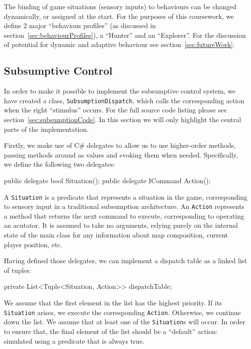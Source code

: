 \documentclass[11pt]{article}
\begin{document}
The binding of game situations (sensory inputs) to behaviours can be changed dynamically, or assigned at the start. For the purposes of this coursework, we define 2 major ``behavious profiles'' (as discussed in section~\ref{sec:behaviourProfiles}), a ``Hunter'' and an ``Explorer''. For the discussion of potential for dynamic and adaptive behaviour see section~\ref{sec:futureWork}.
\subsection{Subsumptive Control}

In order to make it possible to implement the subsumptive control system, we have created a class, \verb|SubsumptionDispatch|, which calls the corresponding action when the right ``stimulus'' occurs. For the full source code listing please see section~\ref{sec:subsumptionCode}. In this section we will only highlight the central parts of the implementation.

Firstly, we make use of C\# delegates to allow us to use higher-order methods, passing methods around as values and evoking them when needed. Specifically, we define the following two delegates:

\begin{code}
public delegate bool Situation();
public delegate ICommand Action();
\end{code}

A \verb|Situation| is a predicate that represents a situation in the game, corresponding to sensory input in a traditional subsumption architecture. An \verb|Action| represents a method that returns the next command to execute, corresponding to operating an acutator. It is assumed to take no arguments, relying purely on the internal state of the main class for any information about map composition, current player position, etc.

Having defined those delegates, we can implement a dispatch table as a linked list of tuples:

\begin{code}
private List<Tuple<Situation, Action>> dispatchTable;
\end{code}

We assume that the first element in the list has the highest priority. If its \verb|Situation| arises, we execute the corresponding \verb|Action|. Otherwise, we continue down the list. We assume that at least one of the \verb|Situation|s will occur. In order to ensure that, the final element of the list should be a ``default'' action: simulated using a predicate that is always true.
\end{document}
